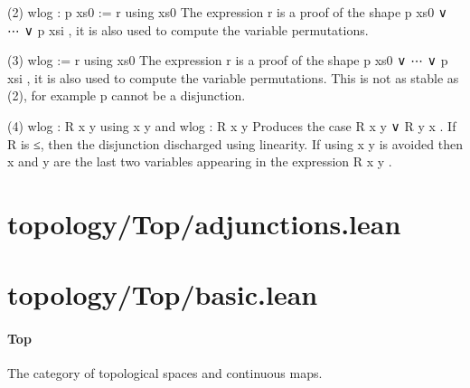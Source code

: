 \documentclass{article}
\begin{document}
\par
(2) 
\colorbox[RGB]{253,246,227}{{{{\color[RGB]{101, 123, 131} wlog : p xs0  }}}{{{\color[RGB]{181, 137, 0} := }}}{{{\color[RGB]{101, 123, 131}  r  }}}{{{\color[RGB]{133, 153, 0} using }}}{{{\color[RGB]{101, 123, 131}  xs0 }}}}The expression 
\colorbox[RGB]{253,246,227}{{{{\color[RGB]{101, 123, 131} r }}}} is a proof of the shape 
\colorbox[RGB]{253,246,227}{{{{\color[RGB]{101, 123, 131} p xs0  }}}{{{\color[RGB]{181, 137, 0} ∨ }}}{{{\color[RGB]{101, 123, 131}  ⋯  }}}{{{\color[RGB]{181, 137, 0} ∨ }}}{{{\color[RGB]{101, 123, 131}  p xsi }}}}, it is also used to compute the
variable permutations.
\par
(3) 
\colorbox[RGB]{253,246,227}{{{{\color[RGB]{101, 123, 131} wlog  }}}{{{\color[RGB]{181, 137, 0} := }}}{{{\color[RGB]{101, 123, 131}  r  }}}{{{\color[RGB]{133, 153, 0} using }}}{{{\color[RGB]{101, 123, 131}  xs0 }}}}The expression 
\colorbox[RGB]{253,246,227}{{{{\color[RGB]{101, 123, 131} r }}}} is a proof of the shape 
\colorbox[RGB]{253,246,227}{{{{\color[RGB]{101, 123, 131} p xs0  }}}{{{\color[RGB]{181, 137, 0} ∨ }}}{{{\color[RGB]{101, 123, 131}  ⋯  }}}{{{\color[RGB]{181, 137, 0} ∨ }}}{{{\color[RGB]{101, 123, 131}  p xsi }}}}, it is also used to compute the
variable permutations. This is not as stable as (2), for example 
\colorbox[RGB]{253,246,227}{{{{\color[RGB]{101, 123, 131} p }}}} cannot be a disjunction.
\par
(4) 
\colorbox[RGB]{253,246,227}{{{{\color[RGB]{101, 123, 131} wlog : R x y  }}}{{{\color[RGB]{133, 153, 0} using }}}{{{\color[RGB]{101, 123, 131}  x y }}}} and 
\colorbox[RGB]{253,246,227}{{{{\color[RGB]{101, 123, 131} wlog : R x y }}}}Produces the case 
\colorbox[RGB]{253,246,227}{{{{\color[RGB]{101, 123, 131} R x y  }}}{{{\color[RGB]{181, 137, 0} ∨ }}}{{{\color[RGB]{101, 123, 131}  R y x }}}}. If 
\colorbox[RGB]{253,246,227}{{{{\color[RGB]{101, 123, 131} R }}}} is ≤, then the disjunction discharged using linearity.
If 
\colorbox[RGB]{253,246,227}{{{{\color[RGB]{133, 153, 0} using }}}{{{\color[RGB]{101, 123, 131}  x y }}}} is avoided then 
\colorbox[RGB]{253,246,227}{{{{\color[RGB]{101, 123, 131} x }}}} and 
\colorbox[RGB]{253,246,227}{{{{\color[RGB]{101, 123, 131} y }}}} are the last two variables appearing in the
expression 
\colorbox[RGB]{253,246,227}{{{{\color[RGB]{101, 123, 131} R x y }}}}.
\section{topology/Top/adjunctions.lean}\section{topology/Top/basic.lean}\paragraph{Top}
\par
The category of topological spaces and continuous maps.
\end{document}
